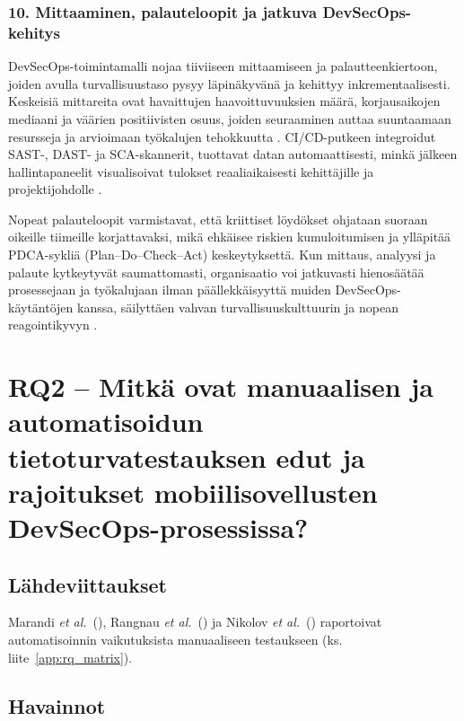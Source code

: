 \documentclass[bscthesis,finnish,oneside,biblatex]{uefcsthesis}
\begin{document}
    \subsubsection{10. Mittaaminen, palauteloopit ja jatkuva DevSecOps-kehitys}

    DevSecOps-toimintamalli nojaa tiiviiseen mittaamiseen ja palautteenkiertoon, joiden avulla turvallisuustaso pysyy läpinäkyvänä ja kehittyy inkrementaalisesti. Keskeisiä mittareita ovat havaittujen haavoittuvuuksien määrä, korjausaikojen mediaani ja väärien positiivisten osuus, joiden seuraaminen auttaa suuntaamaan resursseja ja arvioimaan työkalujen tehokkuutta \cite{chung2024_devsecops}. CI/CD-putkeen integroidut SAST-, DAST- ja SCA-skannerit, tuottavat datan automaattisesti, minkä jälkeen hallintapaneelit visualisoivat tulokset reaaliaikaisesti kehittäjille ja projektijohdolle \cite{marandi2023_ias,feio2024_empirical}.

    Nopeat palauteloopit varmistavat, että kriittiset löydökset ohjataan suoraan oikeille tiimeille korjattavaksi, mikä ehkäisee riskien kumuloitumisen ja ylläpitää PDCA-sykliä (Plan–Do–Check–Act) keskeytyksettä. Kun mittaus, analyysi ja palaute kytkeytyvät saumattomasti, organisaatio voi jatkuvasti hienosäätää prosessejaan ja työkalujaan ilman päällekkäisyyttä muiden DevSecOps-käytäntöjen kanssa, säilyttäen vahvan turvallisuuskulttuurin ja nopean reagointikyvyn \cite{feio2024_empirical}.



    \section{RQ2 – Mitkä ovat manuaalisen ja automatisoidun tietoturvatestauksen edut ja rajoitukset mobiilisovellusten DevSecOps-prosessissa?}
    \label{sec:rq2}

    \subsection{Lähdeviittaukset}
    Marandi \emph{et al.}\ (\citeyear{marandi2023_ias}),
    Rangnau \emph{et al.}\ (\citeyear{putra2022_devsecops}) ja Nikolov \emph{et al.}\ (\citeyear{rangnau2020_cst}) raportoivat automatisoinnin vaikutuksista manuaaliseen testaukseen (ks. liite~\ref{app:rq_matrix}).

    \subsection{Havainnot}
\end{document}
